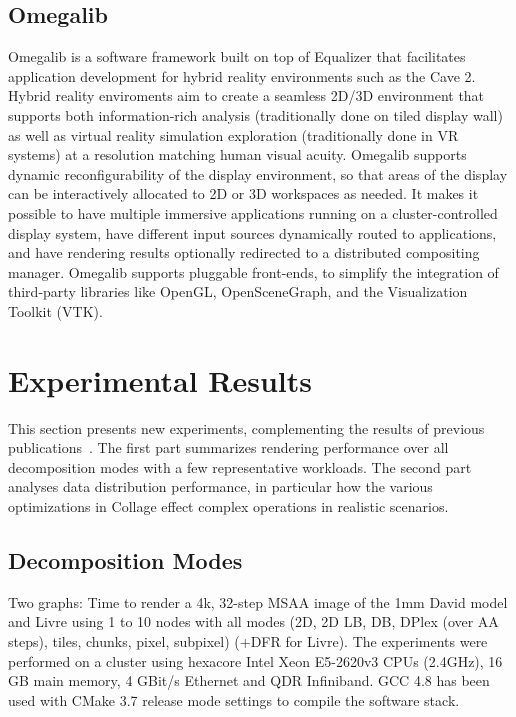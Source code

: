 \documentclass[10pt,journal,compsoc]{IEEEtran}
\newcommand{\FIXME}[1]{\textbf{\color{BLUE}{FIXME: #1}}}
\begin{document}
\subsection{Omegalib}

Omegalib \cite{Omegalib} is a software framework built on top of Equalizer that
facilitates application development for hybrid reality environments such as the
Cave 2. Hybrid reality enviroments aim to create a seamless 2D/3D environment
that supports both information-rich analysis (traditionally done on tiled
display wall) as well as virtual reality simulation exploration (traditionally
done in VR systems) at a resolution matching human visual acuity. Omegalib
supports dynamic reconfigurability of the display environment, so that areas of
the display can be interactively allocated to 2D or 3D workspaces as needed. It
makes it possible to have multiple immersive applications running on a
cluster-controlled display system, have different input sources dynamically
routed to applications, and have rendering results optionally redirected to a
distributed compositing manager. Omegalib supports pluggable front-ends, to
simplify the integration of third-party libraries like OpenGL, OpenSceneGraph,
and the Visualization Toolkit (VTK).

\section{Experimental Results}\label{sec:results}

This section presents new experiments, complementing the results of previous
publications~\cite{EP:07, EMP:09, MEP:10, EEP:11, EBAHMP:12, HBBES:13, deflect,
  SPEP:16}. The first part summarizes rendering performance over all
decomposition modes with a few representative workloads. The second part
analyses data distribution performance, in particular how the various
optimizations in \textsf{Collage} effect complex operations in realistic
scenarios.

\subsection{Decomposition Modes}

Two graphs: Time to render a 4k, 32-step MSAA image of the 1mm David model and
Livre using 1 to 10 nodes with all modes (2D, 2D LB, DB, DPlex (over AA steps),
tiles, chunks, pixel, subpixel) (+DFR for Livre). The experiments were performed on a cluster using hexacore Intel Xeon E5-2620v3 CPUs (2.4GHz), 16 GB main memory, 4 GBit/s Ethernet and QDR Infiniband. GCC 4.8 has been used with CMake 3.7 release mode settings to compile the software stack.	\FIXME{Not sure about Ethernet.}
\end{document}
